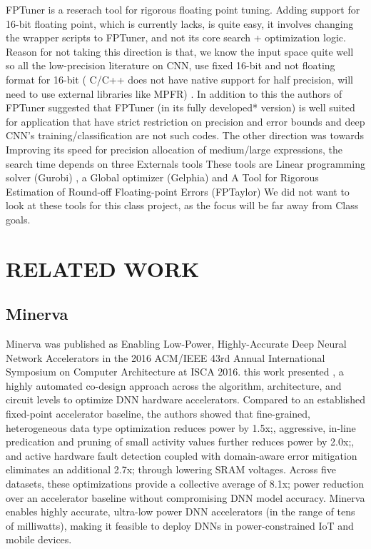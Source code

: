 \documentclass[letterpaper, 10 pt, conference]{ieeeconf}
\begin{document}
FPTuner is a reserach tool for rigorous floating point tuning. Adding support for 16-bit floating point, which is currently
lacks, is quite easy, it involves changing the wrapper scripts to FPTuner, and not its core search + optimization logic.
Reason for not taking this direction is that, we know the input space quite well so all the low-precision 
literature on CNN, use fixed 16-bit and not floating format for 16-bit  ( C/C++ does not have native support
for half precision, will need to use external libraries like MPFR) . In addition to this the authors of 
FPTuner suggested that FPTuner (in its fully developed* version) is well suited for application that have
strict restriction on precision and error bounds and deep CNN’s training/classification are not such codes.
The other direction was towards Improving its speed for precision allocation of medium/large expressions, 
the search time depends on three Externals tools These tools are Linear programming solver (Gurobi) ,
a Global optimizer (Gelphia) and A Tool for Rigorous Estimation of Round-off Floating-point Errors (FPTaylor) 
We did not want to look at these tools for this class project, as the focus will be far away from Class goals.

\section{RELATED WORK}

\subsection{Minerva}

Minerva was published as Enabling Low-Power, Highly-Accurate Deep Neural Network Accelerators in the 
2016 ACM/IEEE 43rd Annual International Symposium on Computer Architecture at ISCA 2016.
this work presented , a highly automated co-design approach across the algorithm, 
architecture, and circuit levels to optimize DNN hardware accelerators.
Compared to an established fixed-point accelerator baseline, the authors showed that fine-grained, 
heterogeneous data type optimization reduces power by 1.5x;, aggressive, in-line predication and 
pruning of small activity values further reduces power by 2.0x;, and 
active hardware fault detection coupled with domain-aware error mitigation eliminates an additional 2.7x; 
through lowering SRAM voltages. 
Across five datasets, these optimizations provide a collective average of 8.1x;
power reduction over an accelerator baseline without compromising DNN model accuracy.
Minerva enables highly accurate, ultra-low power DNN accelerators (in the range of tens of milliwatts), 
making it feasible to deploy DNNs in power-constrained IoT and mobile devices.
\end{document}
